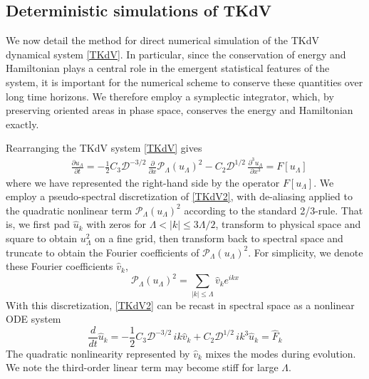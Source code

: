 \documentclass[11pt]{article}
\newcommand{\pd}[2]    { \frac{\partial #1} {\partial #2} }
\newcommand{\td}[2] { \frac{d #1} { d #2 } }
\newcommand{\abs}[1]{\left| #1 \right|}
\newcommand{\drat}{\mathcal{D}}
\newcommand{\uhat}{\hat{u}}
\newcommand{\Proj}{\mathcal{P}_{\Lambda}}
\newcommand{\uL}{u_{\Lambda}}
\newcommand{\RHS}{F}
\newcommand{\RHSh}{\hat{\RHS}}
\newcommand{\usqdah}{\hat{v}} %
\begin{document}
\subsection{Deterministic simulations of TKdV}

We now detail the method for direct numerical simulation of the TKdV dynamical system \eqref{TKdV}. In particular, since the conservation of energy and Hamiltonian plays a central role in the emergent statistical features of the system, it is important for the numerical scheme to conserve these quantities over long time horizons. We therefore employ a symplectic integrator, which, by preserving oriented areas in phase space, conserves the energy and Hamiltonian exactly.

Rearranging the TKdV system \eqref{TKdV} gives
\begin{align}
\label{TKdV2}
&\pd{\uL}{t} = -  \frac{1}{2} C_3 \drat^{-3/2} \, \pd{}{x} \Proj (\uL)^2 - C_2 \drat^{1/2} \, \frac{\partial^3 \uL}{\partial x^3} = \RHS[\uL]
\end{align}	
where we have represented the right-hand side by the operator $\RHS[\uL]$. We employ a pseudo-spectral discretization of \eqref{TKdV2}, with de-aliasing applied to the quadratic nonlinear term $\Proj (\uL)^2$ according to the standard 2/3-rule. That is, we first pad $\uhat_k$ with zeros for $\Lambda < \abs{k} \le 3\Lambda/2$, transform to physical space and square to obtain $\uL^2$ on a fine grid, then transform back to spectral space and truncate to obtain the Fourier coefficients of $\Proj (\uL)^2$.
For simplicity, we denote these Fourier coefficients $\usqdah_k$,
\begin{equation}
\Proj (\uL)^2 = \sum_{\abs{k} \le \Lambda} \usqdah_k e^{i k x}
\end{equation}
With this discretization, \eqref{TKdV2} can be recast in spectral space as a nonlinear ODE system
\begin{equation}
\label{TKdVDisc}
\td{}{t} \uhat_k =  -\frac{1}{2} C_3 \drat^{-3/2} \, ik \usqdah_k + C_2 \drat^{1/2} \, ik^{3} \uhat_k = \RHSh_k
\end{equation}
The quadratic nonlinearity represented by $\usqdah_k$ mixes the modes during evolution. We note the third-order linear term may become stiff for large $\Lambda$.
\end{document}
